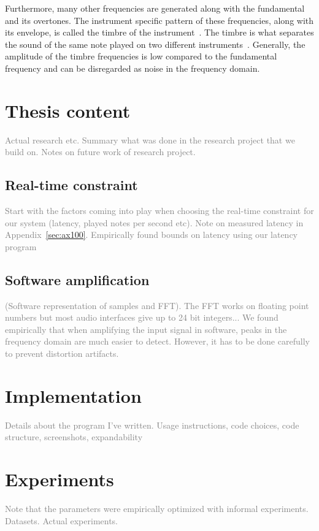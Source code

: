 \documentclass[10pt,twocolumn]{article}
\begin{document}
Furthermore, many other frequencies are generated along with the fundamental and its overtones. The instrument specific pattern of these frequencies, along with its envelope, is called the timbre of the instrument~\cite{timbre}. The timbre is what separates the sound of the same note played on two different instruments~\cite{perception}. Generally, the amplitude of the timbre frequencies is low compared to the fundamental frequency and can be disregarded as noise in the frequency domain.


\section{Thesis content}
\textcolor{gray}{Actual research etc. Summary what was done in the research project that we build on. Notes on future work of research project.}

\subsection{Real-time constraint}  \label{sec:constraint}
\textcolor{gray}{Start with the factors coming into play when choosing the real-time constraint for our system (latency, played notes per second etc). Note on measured latency in Appendix~\ref{sec:ax100}. Empirically found bounds on latency using our latency program}

\subsection{Software amplification}
\textcolor{gray}{(Software representation of samples and FFT). The FFT works on floating point numbers but most audio interfaces give up to 24 bit integers...}
\textcolor{gray}{We found empirically that when amplifying the input signal in software, peaks in the frequency domain are much easier to detect. However, it has to be done carefully to prevent distortion artifacts.}


\section{Implementation}
\textcolor{gray}{Details about the program I've written. Usage instructions, code choices, code structure, screenshots, expandability}


\section{Experiments}  \label{sec:exp}
\textcolor{gray}{Note that the parameters were empirically optimized with informal experiments. Datasets. Actual experiments.}
\end{document}
